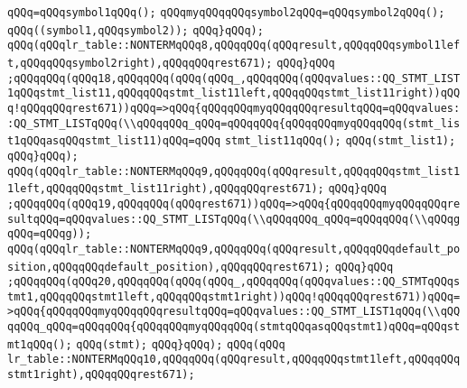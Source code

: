 \verb|qQQq=qQQqsymbol1qQQq();|\newline
\verb|qQQqmyqQQqqQQqsymbol2qQQq=qQQqsymbol2qQQq();|\newline
\verb|qQQq((symbol1,qQQqsymbol2));|\newline
\verb|qQQq}qQQq);|\newline
\verb|qQQq(qQQqlr_table::NONTERMqQQq8,qQQqqQQq(qQQqresult,qQQqqQQqsymbol1left,qQQqqQQqsymbol2right),qQQqqQQqrest671);|\newline
\verb|qQQq}qQQq|\newline
\verb|;qQQqqQQq(qQQq18,qQQqqQQq(qQQq(qQQq_,qQQqqQQq(qQQqvalues::QQ_STMT_LIST1qQQqstmt_list11,qQQqqQQqstmt_list11left,qQQqqQQqstmt_list11right))qQQq!qQQqqQQqrest671))qQQq=>qQQq{qQQqqQQqmyqQQqqQQqresultqQQq=qQQqvalues::QQ_STMT_LISTqQQq(\\qQQqqQQq_qQQq=qQQqqQQq{qQQqqQQqmyqQQqqQQq(stmt_list1qQQqasqQQqstmt_list11)qQQq=qQQq|\newline
\verb|stmt_list11qQQq();|\newline
\verb|qQQq(stmt_list1);|\newline
\verb|qQQq}qQQq);|\newline
\verb|qQQq(qQQqlr_table::NONTERMqQQq9,qQQqqQQq(qQQqresult,qQQqqQQqstmt_list11left,qQQqqQQqstmt_list11right),qQQqqQQqrest671);|\newline
\verb|qQQq}qQQq|\newline
\verb|;qQQqqQQq(qQQq19,qQQqqQQq(qQQqrest671))qQQq=>qQQq{qQQqqQQqmyqQQqqQQqresultqQQq=qQQqvalues::QQ_STMT_LISTqQQq(\\qQQqqQQq_qQQq=qQQqqQQq(\\qQQqgqQQq=qQQqg));|\newline
\verb|qQQq(qQQqlr_table::NONTERMqQQq9,qQQqqQQq(qQQqresult,qQQqqQQqdefault_position,qQQqqQQqdefault_position),qQQqqQQqrest671);|\newline
\verb|qQQq}qQQq|\newline
\verb|;qQQqqQQq(qQQq20,qQQqqQQq(qQQq(qQQq_,qQQqqQQq(qQQqvalues::QQ_STMTqQQqstmt1,qQQqqQQqstmt1left,qQQqqQQqstmt1right))qQQq!qQQqqQQqrest671))qQQq=>qQQq{qQQqqQQqmyqQQqqQQqresultqQQq=qQQqvalues::QQ_STMT_LIST1qQQq(\\qQQqqQQq_qQQq=qQQqqQQq{qQQqqQQqmyqQQqqQQq(stmtqQQqasqQQqstmt1)qQQq=qQQqstmt1qQQq();|\newline
\verb|qQQq(stmt);|\newline
\verb|qQQq}qQQq);|\newline
\verb|qQQq(qQQq|\newline
\verb|lr_table::NONTERMqQQq10,qQQqqQQq(qQQqresult,qQQqqQQqstmt1left,qQQqqQQqstmt1right),qQQqqQQqrest671);|\newline

